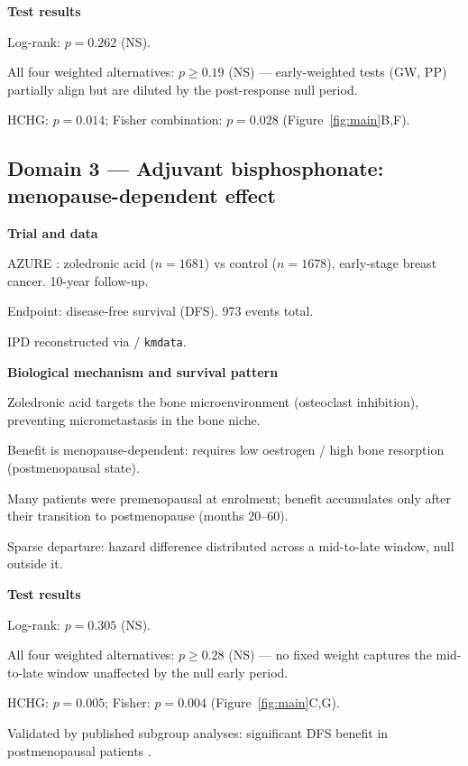 \documentclass[unnumsec,webpdf,contemporary,large]{oup-authoring-template}
\let\origitemize\itemize
\let\origenditemize\enditemize
\renewenvironment{itemize}{%
  \origitemize
  \setlength{\itemsep}{1pt}%
  \setlength{\parskip}{0pt}%
  \setlength{\topsep}{3pt}%
}{\origenditemize}
\begin{document}
\textbf{Test results}
\begin{itemize}
  \item Log-rank: $p = 0.262$ (NS).
  \item All four weighted alternatives: $p \geq 0.19$ (NS) — early-weighted
        tests (GW, PP) partially align but are diluted by the post-response
        null period.
  \item HCHG: $p = 0.014$; Fisher combination: $p = 0.028$
        (Figure~\ref{fig:main}B,F).
\end{itemize}


\subsection*{Domain 3 — Adjuvant bisphosphonate: menopause-dependent effect}

\textbf{Trial and data}
\begin{itemize}
  \item AZURE \citep{coleman2011,coleman2014}: zoledronic acid ($n=1681$)
        vs control ($n=1678$), early-stage breast cancer. 10-year follow-up.
  \item Endpoint: disease-free survival (DFS). 973 events total.
  \item IPD reconstructed via \citet{guyot2012} / \texttt{kmdata}.
\end{itemize}

\textbf{Biological mechanism and survival pattern}
\begin{itemize}
  \item Zoledronic acid targets the bone microenvironment (osteoclast
        inhibition), preventing micrometastasis in the bone niche.
  \item Benefit is menopause-dependent: requires low oestrogen /
        high bone resorption (postmenopausal state).
  \item Many patients were premenopausal at enrolment; benefit accumulates
        only after their transition to postmenopause (months 20--60).
  \item Sparse departure: hazard difference distributed across a
        mid-to-late window, null outside it.
\end{itemize}

\textbf{Test results}
\begin{itemize}
  \item Log-rank: $p = 0.305$ (NS).
  \item All four weighted alternatives: $p \geq 0.28$ (NS) — no fixed
        weight captures the mid-to-late window unaffected by the null
        early period.
  \item HCHG: $p = 0.005$; Fisher: $p = 0.004$
        (Figure~\ref{fig:main}C,G).
  \item Validated by published subgroup analyses: significant DFS benefit
        in postmenopausal patients \citep{coleman2011,coleman2014}.
\end{itemize}
\end{document}
